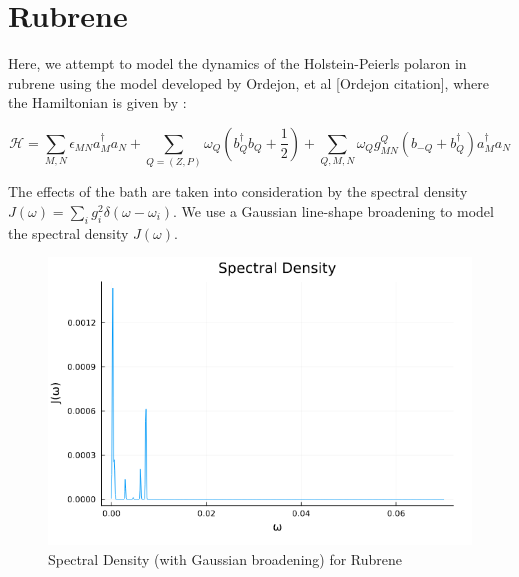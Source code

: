 


\section{Rubrene}

Here, we attempt to model the dynamics of the Holstein-Peierls polaron in rubrene using the model developed by Ordejon, et al [Ordejon citation], where the Hamiltonian is given by :

\begin{equation}
    \mathcal{H} = \sum_{M,N} \epsilon_{MN} a_M^{\dag}a_N + \sum_{Q = (Z,P)} \omega_{Q} (b_Q^{\dag} b_{Q} + \frac{1}{2}) + \sum_{Q, M, N} \omega_{Q} g_{MN}^{Q}(b_{-Q} + b_{Q}^{\dag})a_M^{\dag}a_N 
\end{equation}

The effects of the bath are taken into consideration by the spectral density $J(\omega) = \sum_{i} g_i ^{2} \delta(\omega - \omega_i)$. We use a Gaussian line-shape broadening to model the spectral density $J(\omega)$.


\begin{figure}
    \center
    \includegraphics[scale=0.4]{Figures/jw_rubrene.png}
    \caption{Spectral Density (with Gaussian broadening) for Rubrene}
\end{figure}

